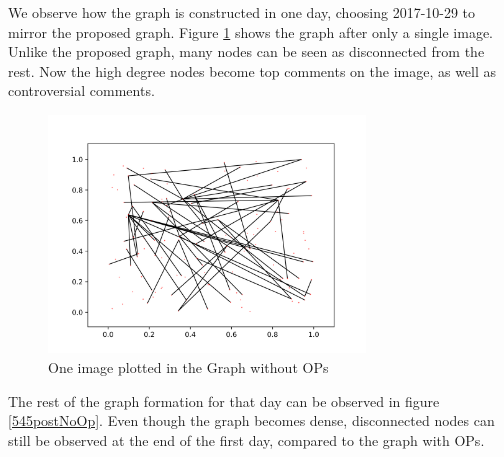 \documentclass{article}
\begin{document}
We observe how the graph is constructed in one day, choosing 2017-10-29 to mirror the proposed graph. Figure \ref{post1NoOp} shows the graph after only a single image. Unlike the proposed graph, many nodes can be seen as disconnected from the rest. Now the high degree nodes become top comments on the image, as well as controversial comments. 

\begin{figure}[h!]
    \centering
    \includegraphics[width=0.75\textwidth]{NormalImgurGraphNoOp1.png}
    \caption{One image plotted in the Graph without OPs}
    \label{post1NoOp}
\end{figure}


The rest of the graph formation for that day can be observed in figure \ref{545postNoOp}. Even though the graph becomes dense, disconnected nodes can still be observed at the end of the first day, compared to the graph with OPs. 
\end{document}
